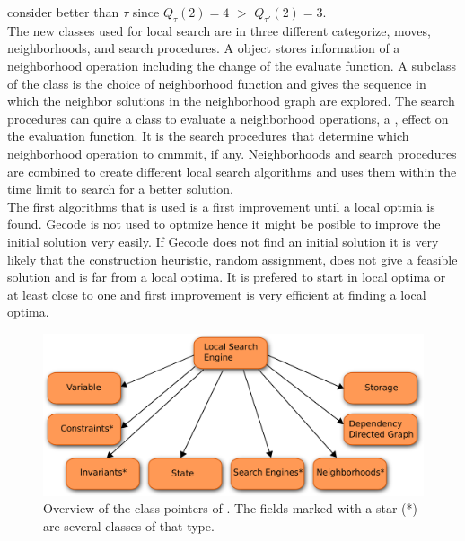 consider better than $\tau$ since $Q_\tau(2) = 4$ $>$ $Q_{\tau'}(2) = 3$. \\
The new classes used for local search are in three different categorize, moves, neighborhoods, and search 
procedures. A  object stores information of a neighborhood operation including the change of the evaluate 
function. A subclass of the  class is the choice of neighborhood function and gives the 
sequence in which the neighbor solutions in the neighborhood graph are explored. The search procedures can quire a 
 class to evaluate a neighborhood operations, a , effect on the evaluation function. It 
is the search procedures that determine which neighborhood operation to cmmmit, if any. Neighborhoods and search 
procedures are combined to create different local search algorithms and  uses them within the 
time limit to search for a better solution. \\
The first algorithms that is used is a first improvement until a local optmia is found. Gecode is not used to optmize 
hence it might be posible to improve the initial solution very easily. If Gecode does not find an initial solution it 
is very likely that the construction heuristic, random assignment, does not give a feasible solution and is far from a 
local optima. It is prefered to start in local optima or at least close to one and first improvement is very efficient 
at finding a local optima. \\
\begin{figure}[!t]
\begin{center}
\includegraphics[width=0.9\linewidth]{LSE}\caption{Overview of the class pointers of . The 
fields 
marked with a star (*) are several classes of that type.} 
\label{fig_lse}
\end{center}
\end{figure}\noindent




